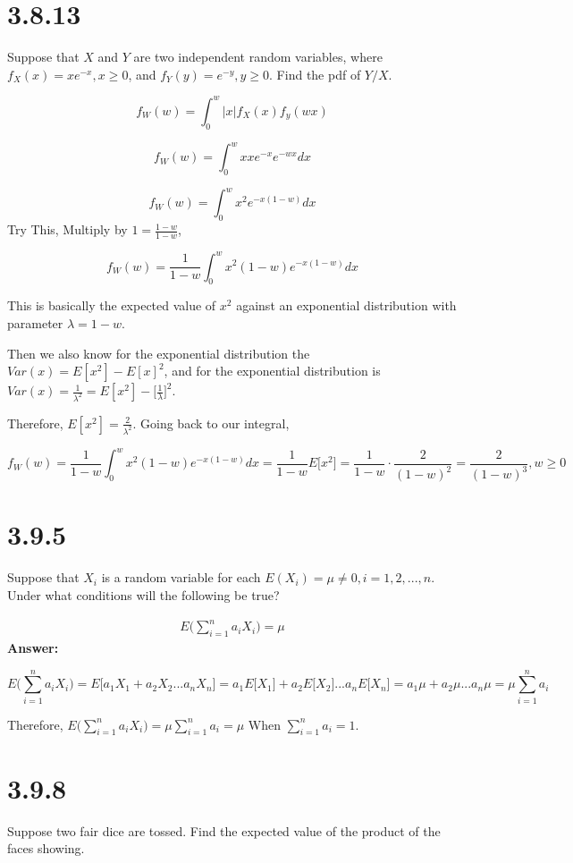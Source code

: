 \documentclass[svgnames]{article}
\begin{document}
\section{3.8.13}
 Suppose that $X$ and $Y$ are two independent random variables, where $f_X(x) = xe^{-x}, x \geq 0$, and $f_Y(y) = e^{-y}, y \geq 0$. Find the pdf of $Y/X$.
 
$$ f_W(w)=\int_{0}^{w}\left|x\right| f_X(x) f_y(wx)$$

$$ f_W(w)=\int_{0}^{w}x x e^{-x}e^{-wx}dx$$

$$ f_W(w)=\int_{0}^{w}x^2 e^{-x(1-w)}dx $$
Try This, Multiply by $1=\frac{1-w}{1-w}$,

$$ f_W(w)=\frac{1}{1-w}\int_{0}^{w}x^2(1-w) e^{-x(1-w)}dx $$

This is basically the expected value of $x^2$ against an exponential distribution with parameter $\lambda= 1-w$.

Then we also know for the exponential distribution the $Var(x)=E[x^2]-E[x]^2$, and for the exponential distribution is $Var(x)=\frac{1}{\lambda^2}=E[x^2] - \Big[\frac{1}{\lambda}\Big]^2$.

Therefore, $E[x^2] =\frac{2}{\lambda^2}$. Going back to our integral,

$$ f_W(w)=\frac{1}{1-w}\int_{0}^{w}x^2(1-w) e^{-x(1-w)}dx = \frac{1}{1-w} E\Big[x^2\Big] =\frac{1}{1-w}\cdot \frac{2}{(1-w)^2}=\frac{2}{(1-w)^3}, w \geq 0$$

 \section{3.9.5}
 Suppose that $X_i$ is a random variable for each $E(X_i) = \mu \neq 0, i = 1, 2, ..., n$. Under what conditions will the following be true?
 
 \begin{align*}
 E\Bigg(\sum_{i=1}^n a_i X_i \Bigg) = \mu
 \end{align*}
\textbf{Answer:}

$$ E\Bigg(\sum_{i=1}^n a_i X_i \Bigg) = E\Big[a_1X_1+a_2X_2...a_nX_n\Big]=a_1E\Big[X_1\Big]+a_2E\Big[X_2\Big]...a_nE\Big[X_n\Big]=a_1\mu+a_2\mu...a_n\mu=\mu\sum_{i=1}^n a_i$$

Therefore, $E\Bigg(\sum_{i=1}^n a_i X_i \Bigg)=\mu\sum_{i=1}^n a_i= \mu$ \newline When $\sum_{i=1}^n a_i=1$. 

\section{3.9.8}
Suppose two fair dice are tossed. Find the expected value of the product of the faces showing.
\end{document}

